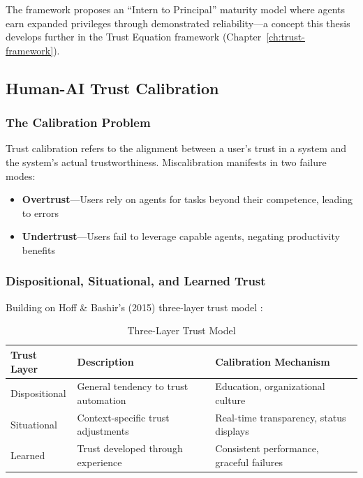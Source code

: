 The framework proposes an ``Intern to Principal'' maturity model where agents earn expanded privileges through demonstrated reliability---a concept this thesis develops further in the Trust Equation framework (Chapter~\ref{ch:trust-framework}).

\subsection{Human-AI Trust Calibration}
\label{subsec:trust-calibration}

\subsubsection{The Calibration Problem}

Trust calibration refers to the alignment between a user's trust in a system and the system's actual trustworthiness. Miscalibration manifests in two failure modes:

\begin{itemize}
    \item \textbf{Overtrust}---Users rely on agents for tasks beyond their competence, leading to errors
    \item \textbf{Undertrust}---Users fail to leverage capable agents, negating productivity benefits
\end{itemize}

\subsubsection{Dispositional, Situational, and Learned Trust}

Building on Hoff \& Bashir's (2015) three-layer trust model \citep{hoff2015}:

\begin{table}[htbp]
\centering
\caption{Three-Layer Trust Model}
\label{tab:three-layer-trust}
\begin{tabular}{lll}
\toprule
\textbf{Trust Layer} & \textbf{Description} & \textbf{Calibration Mechanism} \\
\midrule
Dispositional & General tendency to trust automation & Education, organizational culture \\
Situational & Context-specific trust adjustments & Real-time transparency, status displays \\
Learned & Trust developed through experience & Consistent performance, graceful failures \\
\bottomrule
\end{tabular}
\end{table}

